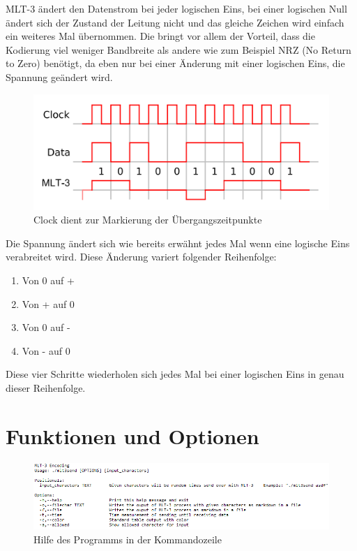\documentclass{article}
\begin{document}
MLT-3 ändert den Datenstrom bei jeder logischen Eins, bei einer logischen Null ändert sich der Zustand der Leitung nicht und das
gleiche Zeichen wird einfach ein weiteres Mal übernommen. Die bringt vor allem der Vorteil, dass die Kodierung viel weniger Bandbreite als
andere wie zum Beispiel NRZ (No Return to Zero) benötigt, da eben nur bei einer Änderung mit einer logischen Eins, die Spannung geändert wird.

\begin{center}
\begin{figure}[h]
    \centering
    \includegraphics[width=\textwidth]{MLT3encoding.png}
    \caption{Clock dient zur Markierung der Übergangszeitpunkte}
\end{figure}
\end{center}
\break

Die Spannung ändert sich wie bereits erwähnt jedes Mal wenn eine logische Eins verabreitet wird. Diese Änderung variert folgender
Reihenfolge:

\begin{enumerate}
	\item Von 0 auf +
	\item Von + auf 0
	\item Von 0 auf -
	\item Von - auf 0
\end{enumerate}

Diese vier Schritte wiederholen sich jedes Mal bei einer logischen Eins in genau dieser Reihenfolge.

\section{Funktionen und Optionen}

\begin{center}
\begin{figure}[h]
    \centering
    \includegraphics[width=16cm]{climenu.png}
    \caption{Hilfe des Programms in der Kommandozeile}
\end{figure}
\end{center}
\end{document}
